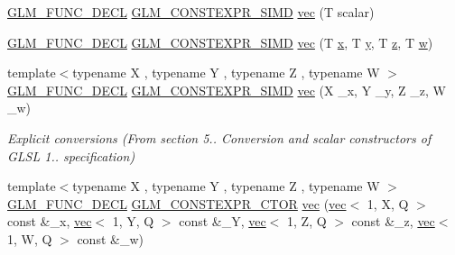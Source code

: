 \begin{DoxyCompactItemize}
\item 
\hyperlink{setup_8hpp_ab2d052de21a70539923e9bcbf6e83a51}{G\+L\+M\+\_\+\+F\+U\+N\+C\+\_\+\+D\+E\+CL} \hyperlink{setup_8hpp_ae5de828d10226b21e2123dd61f3cb5ed}{G\+L\+M\+\_\+\+C\+O\+N\+S\+T\+E\+X\+P\+R\+\_\+\+S\+I\+MD} \hyperlink{structglm_1_1vec_3_014_00_01_t_00_01_q_01_4_ad2cec87eaf8ded14b0173cef509ecdbb}{vec} (T scalar)
\item 
\hyperlink{setup_8hpp_ab2d052de21a70539923e9bcbf6e83a51}{G\+L\+M\+\_\+\+F\+U\+N\+C\+\_\+\+D\+E\+CL} \hyperlink{setup_8hpp_ae5de828d10226b21e2123dd61f3cb5ed}{G\+L\+M\+\_\+\+C\+O\+N\+S\+T\+E\+X\+P\+R\+\_\+\+S\+I\+MD} \hyperlink{structglm_1_1vec_3_014_00_01_t_00_01_q_01_4_a780f2ba10078d7f0dd8348e288042aac}{vec} (T \hyperlink{_s_d_l__opengl_8h_ad0e63d0edcdbd3d79554076bf309fd47}{x}, T \hyperlink{_s_d_l__opengl_8h_a1675d9d7bb68e1657ff028643b4037e3}{y}, T \hyperlink{_s_d_l__opengl__glext_8h_a5e74030ebb3297ce1b37ff716fedd68f}{z}, T \hyperlink{_s_d_l__opengl__glext_8h_a6ee8f168a7ab6785a9bb57c6715dad99}{w})
\item 
{\footnotesize template$<$typename X , typename Y , typename Z , typename W $>$ }\\\hyperlink{setup_8hpp_ab2d052de21a70539923e9bcbf6e83a51}{G\+L\+M\+\_\+\+F\+U\+N\+C\+\_\+\+D\+E\+CL} \hyperlink{setup_8hpp_ae5de828d10226b21e2123dd61f3cb5ed}{G\+L\+M\+\_\+\+C\+O\+N\+S\+T\+E\+X\+P\+R\+\_\+\+S\+I\+MD} \hyperlink{structglm_1_1vec_3_014_00_01_t_00_01_q_01_4_a5ed4d92395313bc109f2363d8cc29d86}{vec} (X \+\_\+x, Y \+\_\+y, Z \+\_\+z, W \+\_\+w)
\begin{DoxyCompactList}\small\item\em Explicit conversions (From section 5.. Conversion and scalar constructors of G\+L\+SL 1.. specification) \end{DoxyCompactList}\item 
{\footnotesize template$<$typename X , typename Y , typename Z , typename W $>$ }\\\hyperlink{setup_8hpp_ab2d052de21a70539923e9bcbf6e83a51}{G\+L\+M\+\_\+\+F\+U\+N\+C\+\_\+\+D\+E\+CL} \hyperlink{setup_8hpp_ad34178a09666081abdb573c14d1f4a5a}{G\+L\+M\+\_\+\+C\+O\+N\+S\+T\+E\+X\+P\+R\+\_\+\+C\+T\+OR} \hyperlink{structglm_1_1vec_3_014_00_01_t_00_01_q_01_4_ac1010f23f9fb2dce17ac5dcba8a37dab}{vec} (\hyperlink{structglm_1_1vec}{vec}$<$ 1, X, Q $>$ const \&\+\_\+x, \hyperlink{structglm_1_1vec}{vec}$<$ 1, Y, Q $>$ const \&\+\_\+Y, \hyperlink{structglm_1_1vec}{vec}$<$ 1, Z, Q $>$ const \&\+\_\+z, \hyperlink{structglm_1_1vec}{vec}$<$ 1, W, Q $>$ const \&\+\_\+w)
\item 

\end{DoxyCompactItemize}
